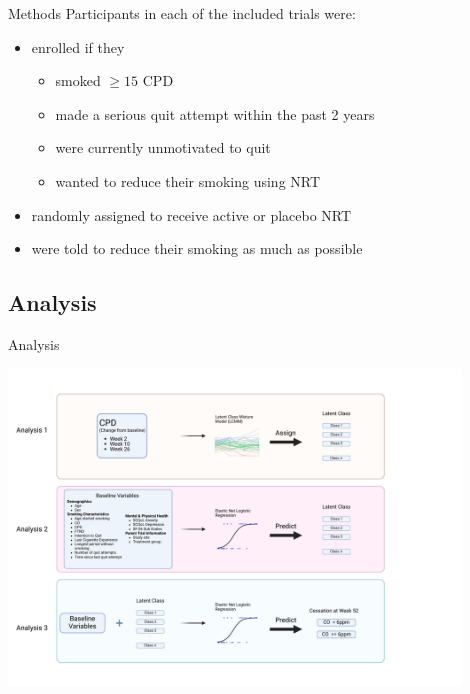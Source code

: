 \documentclass[aspectratio=169]{beamer}
\begin{document}
\begin{frame}{Methods}
		Participants in each of the included trials were:
		\begin{itemize}
		\item enrolled if they 
		\begin{itemize}
			\item smoked $\geq 15$ CPD
			\pause
			\item made a serious quit attempt within the past 2 years 
			\pause
			\item were currently unmotivated to quit
			\pause
			\item wanted to reduce their smoking using NRT
		\end{itemize}
		\pause
		\item randomly assigned to receive active or placebo NRT 
		\pause
		\item were told to reduce their smoking as much as possible

	\end{itemize}
		\vspace{2cm}
\end{frame}

	
\subsection{Analysis}

\begin{frame}{Analysis}


\centering
\includegraphics[width=0.9\textwidth]{overview}

\end{frame}
\end{document}
